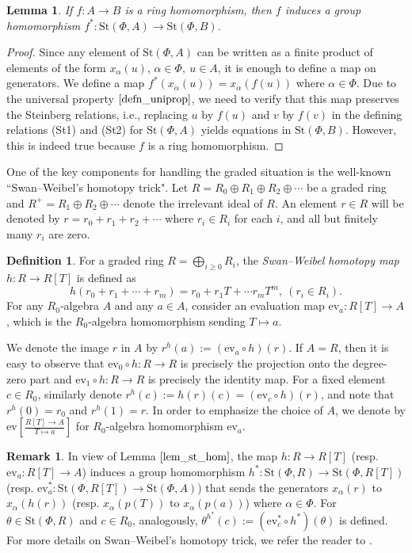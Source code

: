 \documentclass[11pt]{amsart}
\newtheorem{lem}[thm]{Lemma}
\theoremstyle{definition}
\newtheorem{defn}[thm]{Definition}
\newtheorem{remk}[thm]{Remark}
\numberwithin{equation}{section}
\numberwithin{equation}{section}
\newenvironment{rem}{\begin{remk}}%
{\end{remk}}
\newcommand{\<}{\langle}
\renewcommand{\>}{\rangle}
\newcommand{\St}{\mathrm{St}}
\newcommand{\ev}{\mathrm{ev}}
\begin{document}
\begin{lem}
    If $f: A\to B$  is a ring homomorphism, then $f$ induces a group homomorphism $f^{\ast}:\St(\Phi,A)\to \St(\Phi, B)$.\label{lem_st_hom}
\end{lem}
\begin{proof}
    Since any element of $\St(\Phi,A)$ can be written as a finite product of elements of the form $x_{\alpha}(u)$, $\alpha\in \Phi,~u\in A$, it is enough to define a map on generators. We define a map $f^{\ast}(x_{\alpha}(u))=x_{\alpha}(f(u))$ where $\alpha\in \Phi$. Due to the universal property $\ref{defn_uniprop}$, we need to verify that this map preserves the Steinberg relations, i.e., replacing $u$ by $f(u)$ and $v$ by $f(v)$ in the defining relations {\rm (St1)} and {\rm (St2)} for $\St(\Phi,A)$ yields equations in $\St(\Phi,B)$. However, this is indeed true because $f$ is a ring homomorphism.
\end{proof}
One of the key components for handling the graded situation is the well-known ``Swan--Weibel's homotopy trick".
Let $R=R_{0}\oplus R_{1}\oplus R_{2}\oplus\cdots$ be a graded ring and $R^{+}=R_{1}\oplus R_{2}\oplus\cdots$ denote the irrelevant ideal of $R$. An element $r\in R$ will be denoted by $r=r_0+r_1+r_2+\cdots$ where $r_i\in R_i$ for each $i$, and all but finitely many $r_{i}$ are zero.
\begin{defn}\label{def_sw_map}
    For a graded ring $R=\bigoplus_{i\geq 0}R_{i}$, the {\it Swan--Weibel homotopy map} $h:R\to R[T]$ is defined as \[h(r_0+r_1+\cdots+r_m)=r_0+r_1 T+\cdots r_m T^{m}, ~(r_{i}\in R_{i}).\]
For any $R_0$-algebra $A$ and any $a\in A$, consider an evaluation map $\ev_{a}:R[T]\to A$, which is the $R_0$-algebra homomorphism sending $T\mapsto a$.
\end{defn}
We denote the image $r$ in $A$ by $r^{h}(a):=(\ev_{a}\circ h)(r)$. If $A=R$, then it is easy to observe that $\ev_{0}\circ h: R\to R$ is precisely the projection onto the degree-zero part and $\ev_{1}\circ h: R\to R$ is precisely the identity map. For a fixed element $c\in R_0$, similarly denote $r^{h}(c):=h(r)(c)= (\ev_{c}\circ h)(r)$, and note that $r^{h}(0)=r_0$ and $r^{h}(1)=r$. In order to emphasize the choice of $A$, we denote by $\ev\left [\frac{R[T]\to A}{T\mapsto a}\right ]$ for $R_0$-algebra homomorphism $\ev_{a}$. 
\begin{rem}\label{rem_st_ev}
In view of Lemma $\ref{lem_st_hom}$, the map $h:R\to R[T]$ (resp. $\ev_{a}:R[T]\to A$) induces a group homomorphism $h^{\ast}:\St(\Phi,R)\to \St(\Phi,R[T])$ (resp. $\ev_{a}^{\ast}:\St(\Phi,R[T])\to \St(\Phi,A)$) that sends the generators $x_{\alpha}(r)$ to $x_{\alpha}(h(r))$ (resp. $x_{\alpha}(p(T))$ to $x_{\alpha}(p(a))$) where $\alpha\in \Phi$. For $\theta\in \St(\Phi,R)$ and $c\in R_{0}$, analogously, $\theta^{h^{\ast}}(c):=(\ev_{c}^{\ast}\circ h^{\ast})(\theta)$ is defined. For more details on Swan--Weibel's homotopy trick, we refer the reader to \cite[Chapter V]{Lambook}.
\end{rem}
\end{document}
